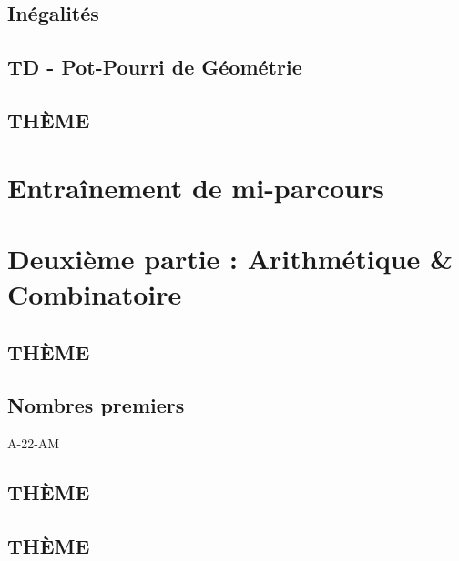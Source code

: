 \documentclass[poly,trombi]{valbonne}
\begin{document}

\subsection{Inégalités}


\subsection{TD - Pot-Pourri de Géométrie}


\subsection{THÈME}



\section{Entraînement de mi-parcours}



\section{Deuxième partie : Arithmétique \& Combinatoire}

\subsection{THÈME}


\subsection{Nombres premiers}

{A-22-AM}

\subsection{THÈME}


\subsection{THÈME}
\end{document}
